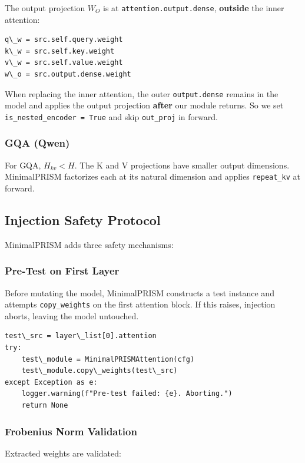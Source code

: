 The output projection $W_O$ is at \texttt{attention.output.dense}, \textbf{outside} the 
inner attention:

\begin{lstlisting}
q\_w = src.self.query.weight
k\_w = src.self.key.weight
v\_w = src.self.value.weight
w\_o = src.output.dense.weight
\end{lstlisting}

When replacing the inner attention, the outer \texttt{output.dense} remains in the 
model and applies the output projection \textbf{after} our module returns. So we 
set \texttt{is\_nested\_encoder = True} and skip \texttt{out\_proj} in forward.

\subsubsection{GQA (Qwen)}

For GQA, $H_{kv} < H$. The K and V projections have smaller output 
dimensions. MinimalPRISM factorizes each at its natural dimension and applies 
\texttt{repeat\_kv} at forward.

\subsection{Injection Safety Protocol}

MinimalPRISM adds three safety mechanisms:

\subsubsection{Pre-Test on First Layer}

Before mutating the model, MinimalPRISM constructs a test instance and 
attempts \texttt{copy\_weights} on the first attention block. If this raises, 
injection aborts, leaving the model untouched.

\begin{lstlisting}
test\_src = layer\_list[0].attention
try:
    test\_module = MinimalPRISMAttention(cfg)
    test\_module.copy\_weights(test\_src)
except Exception as e:
    logger.warning(f"Pre-test failed: {e}. Aborting.")
    return None
\end{lstlisting}

\subsubsection{Frobenius Norm Validation}

Extracted weights are validated:

